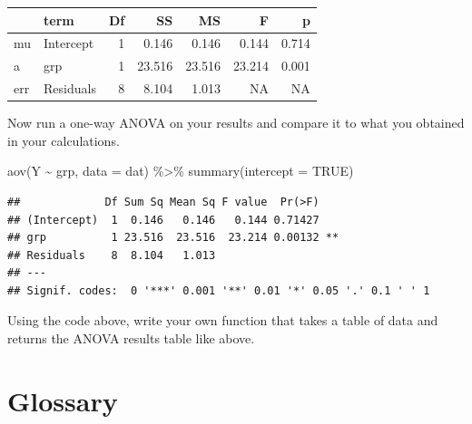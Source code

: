 \documentclass[
  oneside]{book}
\newenvironment{Shaded}{\begin{snugshade}}{\end{snugshade}}
\newcommand{\AttributeTok}[1]{\textcolor[rgb]{0.77,0.63,0.00}{#1}}
\newcommand{\ConstantTok}[1]{\textcolor[rgb]{0.00,0.00,0.00}{#1}}
\newcommand{\FunctionTok}[1]{\textcolor[rgb]{0.00,0.00,0.00}{#1}}
\newcommand{\NormalTok}[1]{#1}
\newcommand{\SpecialCharTok}[1]{\textcolor[rgb]{0.00,0.00,0.00}{#1}}
\begin{document}
\begin{tabular}{l|l|r|r|r|r|r}
\hline
  & term & Df & SS & MS & F & p\\
\hline
mu & Intercept & 1 & 0.146 & 0.146 & 0.144 & 0.714\\
\hline
a & grp & 1 & 23.516 & 23.516 & 23.214 & 0.001\\
\hline
err & Residuals & 8 & 8.104 & 1.013 & NA & NA\\
\hline
\end{tabular}

Now run a one-way ANOVA on your results and compare it to what you obtained in your calculations.

\begin{Shaded}
\begin{Highlighting}[]
\FunctionTok{aov}\NormalTok{(Y }\SpecialCharTok{\textasciitilde{}}\NormalTok{ grp, }\AttributeTok{data =}\NormalTok{ dat) }\SpecialCharTok{\%\textgreater{}\%} \FunctionTok{summary}\NormalTok{(}\AttributeTok{intercept =} \ConstantTok{TRUE}\NormalTok{)}
\end{Highlighting}
\end{Shaded}

\begin{verbatim}
##             Df Sum Sq Mean Sq F value  Pr(>F)   
## (Intercept)  1  0.146   0.146   0.144 0.71427   
## grp          1 23.516  23.516  23.214 0.00132 **
## Residuals    8  8.104   1.013                   
## ---
## Signif. codes:  0 '***' 0.001 '**' 0.01 '*' 0.05 '.' 0.1 ' ' 1
\end{verbatim}

\begin{try}
Using the code above, write your own function that takes a table of data and returns the ANOVA results table like above.

\end{try}

\hypertarget{glossary-glm}{%
\section{Glossary}\label{glossary-glm}}
\end{document}
